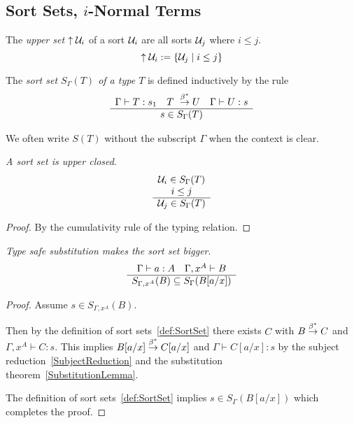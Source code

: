 \subsection{Sort Sets, $i$-Normal Terms}


\begin{definition}
    \label{def:UpperSet}
    The \emph{upper set} ${\uparrow {\cal U}_i}$ of a sort ${\cal U}_i$ are all sorts
    ${\cal U}_j$ where $i \le j$.
    $$
    {\uparrow {\cal U}_i} := {\left\{{\cal U}_j \mid i \le j\right\}}
    $$
\end{definition}




\begin{definition}
    \label{def:SortSet}
    The \emph{sort set $S_\Gamma(T)$ of a type $T$} is defined inductively by
    the rule
    $$
    \ruleh{
        \Gamma \vdash T : s_1\quad
        T \reducestar U\quad
        \Gamma \vdash U : s
    }
    {
        s \in S_\Gamma(T)
    }
    $$

    We often write $S(T)$ without the subscript $\Gamma$ when the context is
    clear.
\end{definition}





\begin{theorem}
    \label{thm:SortSetUpperClosed}
    \emph{A sort set is upper closed}.
    $$
        \begin{array}{c} 
            {\cal U}_i \in S_\Gamma(T)
            \\
            i \le j
         \\ \hline 
            {\cal U}_j \in S_\Gamma(T)
        \end{array}
    $$
    \begin{proof}
        By the cumulativity rule of the typing relation.
    \end{proof}
\end{theorem}






\begin{theorem}
    \label{thm:SortSetSubstitution}
    \emph{Type safe substitution makes the sort set bigger}.
    $$
        \begin{array}{c} 
            \Gamma \vdash a : A \quad \Gamma,x^A \vdash B
         \\ \hline 
            S_{\Gamma,x^A}(B) \subseteq S_\Gamma(B[a/x])
        \end{array}
    $$
    \begin{proof}
        Assume $s \in S_{\Gamma,x^A}(B)$.

        Then by the definition of sort sets~\ref{def:SortSet}
        there exists $C$ with $B \stackrel{\beta^*}{\to} C$ and $\Gamma,x^A \vdash C: s$.
        This implies $B[a/x] \stackrel{\beta^*}{\to} C[a/x]$ and $\Gamma \vdash C[a/x] : s$
        by the subject reduction~\ref{SubjectReduction} and the substitution
        theorem~\ref{SubstitutionLemma}.

        The definition of sort sets~\ref{def:SortSet} implies $s \in
        S_\Gamma(B[a/x])$ which completes the proof.
    \end{proof}
\end{theorem}






